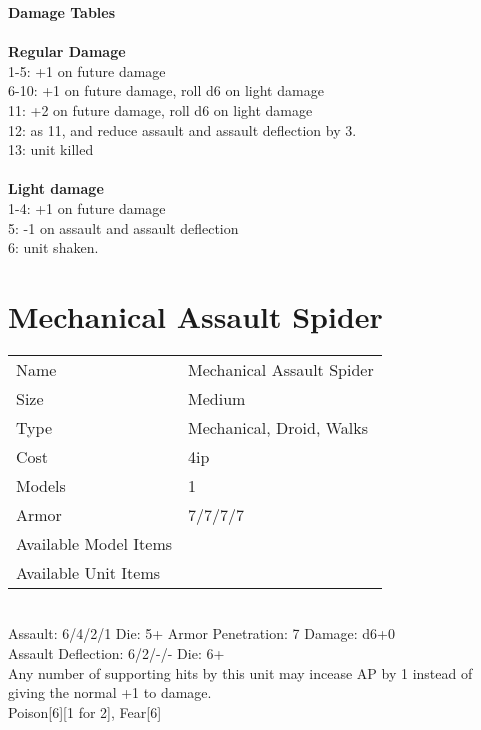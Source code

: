 {\bf Damage Tables} \\
\ \\ {\bf Regular Damage } \\
1-5: +1 on future damage \\
6-10: +1 on future damage, roll d6 on light damage \\
11: +2 on future damage, roll d6 on light damage \\
12: as 11, and reduce assault and assault deflection by 3. \\
13: unit killed \\
\ \\ {\bf Light damage } \\
1-4: +1 on future damage \\
5: -1 on assault and assault deflection \\
6: unit shaken. \\









\pagebreak

\section{ Mechanical Assault Spider }

\begin{tabular}{ll}
  Name & Mechanical Assault Spider \\
  Size & Medium\\
  Type & Mechanical, Droid, Walks\\
  Cost & 4ip\\
  Models & 1\\
  Armor & 7/7/7/7\\
  Available Model Items &  \\
  Available Unit Items &  \\
\end{tabular}

\ \\
Assault: 6/4/2/1 Die: 5+ Armor Penetration: 7 Damage: d6+0 \\
Assault Deflection: 6/2/-/- Die: 6+\\
\indent Any number of supporting hits by this unit may incease AP by 1 instead of giving the normal +1 to damage. \\ Poison[6][1 for 2], Fear[6]   \\
\ \\

